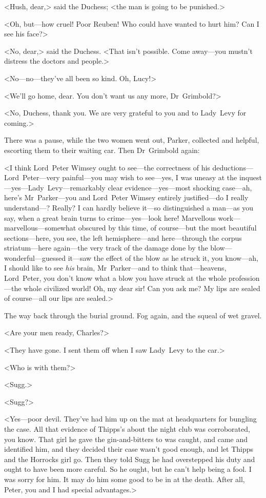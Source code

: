 <Hush, dear,> said the Duchess; <the man is going to be punished.>

<Oh, but—how cruel! Poor Reuben! Who could have wanted to hurt him? Can I see his face?>

<No, dear,> said the Duchess. <That isn't possible. Come away—you mustn't distress the doctors and people.>

<No—no—they've all been so kind. Oh, Lucy!>

<We'll go home, dear. You don't want us any more, Dr~Grimbold?>

<No, Duchess, thank you. We are very grateful to you and to Lady~Levy for coming.>

There was a pause, while the two women went out, Parker, collected and helpful, escorting them to their waiting car. Then Dr~Grimbold again:

<I think Lord~Peter Wimsey ought to see—the correctness of his deductions—Lord~Peter—very painful—you may wish to see—yes, I was uneasy at the inquest—yes—Lady~Levy—remarkably clear evidence—yes—most shocking case—ah, here's Mr~Parker—you and Lord~Peter Wimsey entirely justified—do I really under\-stand—? Really? I can hardly believe it—so distinguished a man—as you say, when a great brain turns to crime—yes—look here! Marvellous work—marvellous—somewhat obscured by this time, of course—but the most beautiful sections—here, you see, the left hemisphere—and here—through the corpus striatum—here again—the very track of the damage done by the blow—wonderful—guessed it—saw the effect of the blow as he struck it, you know—ah, I should like to see \textit{his} brain, Mr~Parker—and to think that—heavens, Lord~Peter, you don't know what a blow you have struck at the whole profession—the whole civilized world! Oh, my dear sir! Can you ask me? My lips are sealed of course—all our lips are sealed.>

The way back through the burial ground. Fog again, and the squeal of wet gravel.

<Are your men ready, Charles?>

<They have gone. I sent them off when I saw Lady~Levy to the car.>

<Who is with them?>

<Sugg.>

<Sugg?>

<Yes—poor devil. They've had him up on the mat at headquarters for bungling the case. All that evidence of Thipps's about the night club was corroborated, you know. That girl he gave the gin-and-bitters to was caught, and came and identified him, and they decided their case wasn't good enough, and let Thipps and the Horrocks girl go. Then they told Sugg he had overstepped his duty and ought to have been more careful. So he ought, but he can't help being a fool. I was sorry for him. It may do him some good to be in at the death. After all, Peter, you and I had special advantages.>

